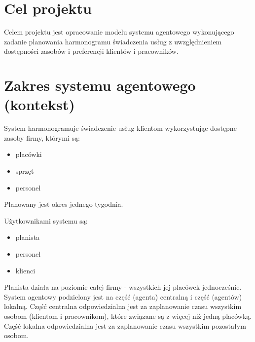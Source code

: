 \documentclass[oneside]{article}
\begin{document}

\section{Cel projektu}
Celem projektu jest opracowanie modelu systemu agentowego
wykonującego zadanie planowania harmonogramu świadczenia usług
z uwzględnieniem dostępności zasobów i preferencji klientów i pracowników.

\section{Zakres systemu agentowego (kontekst)} \label{Zakres}
System harmonogramuje świadczenie usług klientom wykorzystując dostępne zasoby firmy, którymi są:
\begin{itemize}
	\item{placówki}
	\item{sprzęt}
	\item{personel}
\end{itemize}
Planowany jest okres jednego tygodnia.

Użytkownikami systemu są:
\begin{itemize}
	\item{planista}
	\item{personel}
	\item{klienci}
\end{itemize}
Planista działa na poziomie całej firmy - wszystkich jej placówek jednocześnie.
System agentowy podzielony jest na część (agenta) centralną i część (agentów)
lokalną. Część centralna odpowiedzialna jest za zaplanowanie czasu wszystkim
osobom (klientom i pracownikom), które związane są z więcej niż jedną placówką.
Część lokalna odpowiedzialna jest za zaplanowanie czasu wszystkim pozostałym
osobom.







\end{document}
